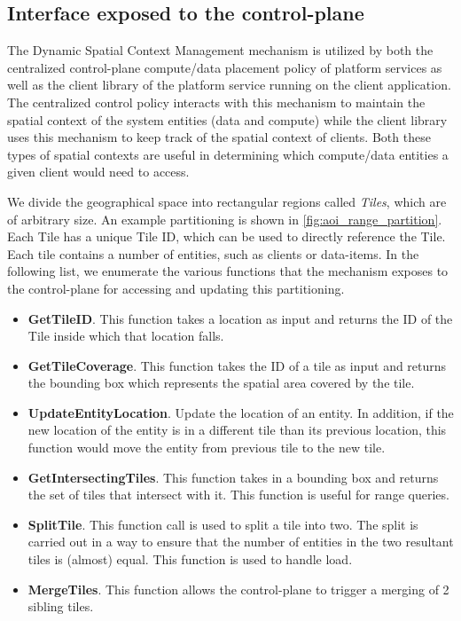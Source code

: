 \subsection{Interface exposed to the control-plane}
The Dynamic Spatial Context Management mechanism is utilized by both the centralized control-plane compute/data placement policy of platform services as well as the client library of the platform service running on the client application. The centralized control policy interacts with this mechanism to maintain the spatial context of the system entities (data and compute) while the client library uses this mechanism to keep track of the spatial context of clients. Both these types of spatial contexts are useful in determining which compute/data entities a given client would need to access. 
\par We divide the geographical space into rectangular regions called \textit{Tiles}, which are of arbitrary size. An example partitioning is shown in \cref{fig:aoi_range_partition}. Each Tile has a unique Tile ID, which can be used to directly reference the Tile. Each tile contains a number of entities, such as clients or data-items. In the following list, we enumerate the various functions that the mechanism exposes to the control-plane for accessing and updating this partitioning.
\begin{itemize}
\item \textbf{GetTileID}. This function takes a location as input and returns the ID of the Tile inside which that location falls.
\item \textbf{GetTileCoverage}. This function takes the ID of a tile as input and returns the bounding box which represents the spatial area covered by the tile.
\item \textbf{UpdateEntityLocation}. Update the location of an entity. In addition, if the new location of the entity is in a different tile than its previous location, this function would move the entity from previous tile to the new tile. 
\item \textbf{GetIntersectingTiles}. This function takes in a bounding box and returns the set of tiles that intersect with it. This function is useful for range queries.
\item \textbf{SplitTile}. This function call is used to split a tile into two. The split is carried out in a way to ensure that the number of entities in the two resultant tiles is (almost) equal. This function is used to handle load.
\item \textbf{MergeTiles}. This function allows the control-plane to trigger a merging of 2 sibling tiles.
\end{itemize}

